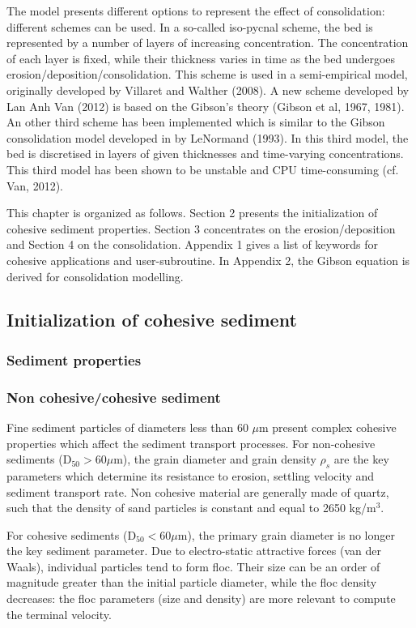 The model presents different options to represent the effect of
consolidation: different schemes can be used. In a so-called iso-pycnal
scheme, the bed is represented by a number of layers of increasing
concentration. The concentration of each layer is fixed, while their
thickness varies in time as the bed undergoes erosion/deposition/consolidation. This scheme is used in a semi-empirical
model, originally developed by Villaret and Walther (2008). A new scheme
developed by Lan Anh Van (2012) is based on the Gibson's theory (Gibson et
al, 1967, 1981). An other third scheme has been implemented which is similar
to the Gibson consolidation model developed in \telddd by LeNormand (1993).
In this third model, the bed is discretised in layers of given thicknesses
and time-varying concentrations. This third model has been shown to be
unstable and CPU time-consuming (cf. Van, 2012). 

This chapter is organized as follows. Section 2 presents the initialization of cohesive sediment
properties. Section 3 concentrates on the erosion/deposition and Section 4 on the
consolidation. Appendix 1 gives a list of keywords for cohesive applications and user-subroutine. In
Appendix 2, the Gibson equation is derived for consolidation modelling.

\subsection{Initialization of cohesive sediment}

\subsubsection{Sediment properties}
\subsubsection*{Non cohesive/cohesive sediment}
Fine sediment particles of diameters less than 60 $\mu$m present complex
cohesive properties which affect the sediment transport processes.
For non-cohesive sediments (D$_{50}>60\mu$m), the grain diameter
and grain density $\rho_s$ are the key parameters which determine its
resistance to erosion, settling velocity and sediment transport rate. Non
cohesive material are generally made of quartz, such that the density of
sand particles is constant and equal to 2650 kg/m$^{3}$. 

For cohesive sediments (D$_{50}< 60 \mu$m), the primary grain
diameter is no longer the key sediment parameter. Due to electro-static
attractive forces (van der Waals), individual particles tend to form floc.
Their size can be an order of magnitude greater than the initial particle
diameter, while the floc density decreases: the floc parameters (size and
density) are more relevant to compute the terminal velocity. 

